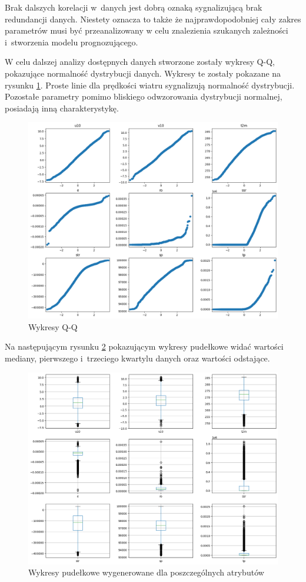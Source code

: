 Brak dalszych korelacji w~danych jest dobrą oznaką sygnalizującą brak redundancji danych.
Niestety oznacza to także że najprawdopodobniej cały zakres parametrów musi być przeanalizowany
w celu znalezienia szukanych zależności i~stworzenia modelu prognozującego. 

W celu dalszej analizy dostępnych danych stworzone zostały wykresy Q-Q, pokazujące normalność
dystrybucji danych. Wykresy te zostały pokazane na rysunku \ref{qq}. Proste linie dla prędkości 
wiatru sygnalizują normalność dystrybucji. Pozostałe parametry pomimo bliskiego odwzorowania
dystrybucji normalnej, posiadają inną charakterystykę. 


\begin{figure}[H]
    \centering
    \includegraphics[width=\textwidth]{images/qq.png}
    \caption{Wykresy Q-Q}
    \label{qq}
\end{figure}

Na następującym rysunku \ref{box} pokazującym wykresy pudełkowe widać wartości mediany, pierwszego i~trzeciego
kwartylu danych oraz wartości odstające. 

\begin{figure}[H]
    \centering
    \includegraphics[width=\textwidth]{images/box.png}
    \caption{Wykresy pudełkowe wygenerowane dla poszczególnych atrybutów}
    \label{box}
\end{figure}

